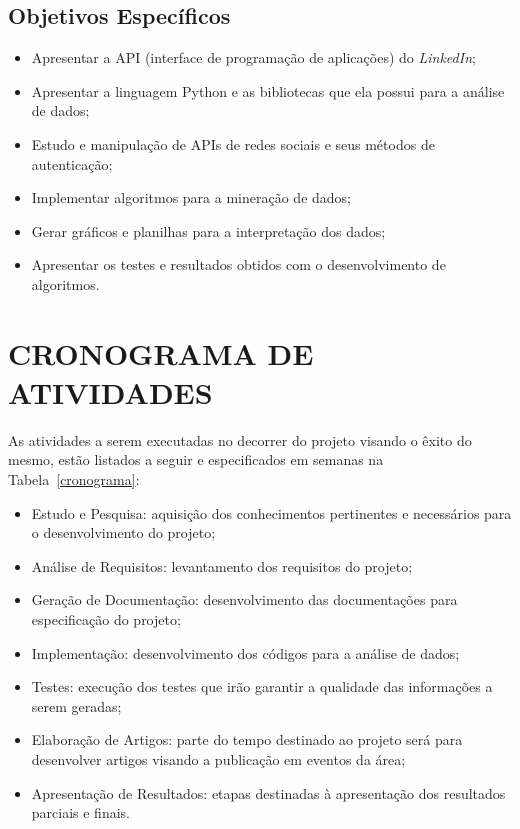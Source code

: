 \subsection{Objetivos Específicos}\label{subsec:objetivos_especificos}

\begin{itemize}
    \item Apresentar a API (interface de programação de aplicações) do \textit{LinkedIn};
    \item Apresentar a linguagem Python e as bibliotecas que ela possui para a análise de dados;
    \item Estudo e manipulação de APIs de redes sociais e seus métodos de autenticação;
    \item Implementar algoritmos para a mineração de dados;
    \item Gerar gráficos e planilhas para a interpretação dos dados;
    \item Apresentar os testes e resultados obtidos com o desenvolvimento de algoritmos.
\end{itemize}

\section{CRONOGRAMA DE ATIVIDADES}\label{subsec:cronograma}

As atividades a serem executadas no decorrer do projeto visando o êxito do mesmo, estão listados a seguir e especificados em semanas na Tabela~\ref{cronograma}:

\begin{itemize}
  \item Estudo e Pesquisa: aquisição dos conhecimentos pertinentes e necessários para o desenvolvimento do projeto;
  \item Análise de Requisitos: levantamento dos requisitos do projeto;
  \item Geração de Documentação: desenvolvimento das documentações para especificação do projeto;
  \item Implementação: desenvolvimento dos códigos para a análise de dados;
  \item Testes: execução dos testes que irão garantir a qualidade das informações a serem geradas;
  \item Elaboração de Artigos: parte do tempo destinado ao projeto será para desenvolver artigos visando a publicação em eventos da área;
  \item Apresentação de Resultados: etapas destinadas à apresentação dos resultados parciais e finais.
\end{itemize}


